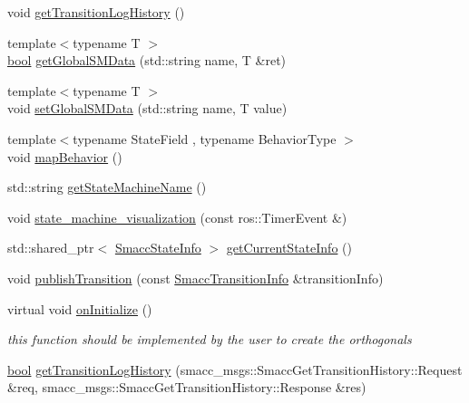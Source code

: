 \begin{DoxyCompactItemize}
\item 
void \hyperlink{classsmacc_1_1ISmaccStateMachine_ae7c08fc2addf8ee4785f721050e6a763}{get\+Transition\+Log\+History} ()
\item 
{\footnotesize template$<$typename T $>$ }\\\hyperlink{classbool}{bool} \hyperlink{classsmacc_1_1ISmaccStateMachine_aeda2d6813c6c428bf318a5792e014b61}{get\+Global\+S\+M\+Data} (std\+::string name, T \&ret)
\item 
{\footnotesize template$<$typename T $>$ }\\void \hyperlink{classsmacc_1_1ISmaccStateMachine_a8588f9e580fbb95b53e2bd2ca3ff1f98}{set\+Global\+S\+M\+Data} (std\+::string name, T value)
\item 
{\footnotesize template$<$typename State\+Field , typename Behavior\+Type $>$ }\\void \hyperlink{classsmacc_1_1ISmaccStateMachine_acfb75233b79062cc7769ea751b7f320d}{map\+Behavior} ()
\item 
std\+::string \hyperlink{classsmacc_1_1ISmaccStateMachine_a2d0b1742f17dd77d5df217153e8b5259}{get\+State\+Machine\+Name} ()
\item 
void \hyperlink{classsmacc_1_1ISmaccStateMachine_ac03029f770422d0ea77ea9856b8cb1a8}{state\+\_\+machine\+\_\+visualization} (const ros\+::\+Timer\+Event \&)
\item 
std\+::shared\+\_\+ptr$<$ \hyperlink{classsmacc_1_1introspection_1_1SmaccStateInfo}{Smacc\+State\+Info} $>$ \hyperlink{classsmacc_1_1ISmaccStateMachine_a4738679e8e5f7adab35e610dce0bfff7}{get\+Current\+State\+Info} ()
\item 
void \hyperlink{classsmacc_1_1ISmaccStateMachine_a06cc53c282c93692829b6efd28e315f4}{publish\+Transition} (const \hyperlink{structsmacc_1_1introspection_1_1SmaccTransitionInfo}{Smacc\+Transition\+Info} \&transition\+Info)
\item 
virtual void \hyperlink{classsmacc_1_1ISmaccStateMachine_ac2982c6c8283663e5e1e8a7c82f511ec}{on\+Initialize} ()
\begin{DoxyCompactList}\small\item\em this function should be implemented by the user to create the orthogonals \end{DoxyCompactList}\item 
\hyperlink{classbool}{bool} \hyperlink{classsmacc_1_1ISmaccStateMachine_a7508f4e398e263cdce308c8074bd5151}{get\+Transition\+Log\+History} (smacc\+\_\+msgs\+::\+Smacc\+Get\+Transition\+History\+::\+Request \&req, smacc\+\_\+msgs\+::\+Smacc\+Get\+Transition\+History\+::\+Response \&res)

\end{DoxyCompactItemize}
